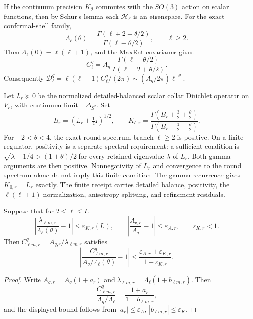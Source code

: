 \begin{theorem}\label{thm:oph-screen-angular-spectrum}
If the continuum precision \(K_\theta\) commutes with the \(SO(3)\) action on scalar functions,
then by Schur's lemma each \(\mathcal H_\ell\) is an eigenspace.  For the exact conformal-shell
family,
\[
  \Lambda_\ell(\theta)
  =\frac{\Gamma(\ell+2+\theta/2)}{\Gamma(\ell-\theta/2)},\qquad \ell\ge2.
\]
Then \(\Lambda_\ell(0)=\ell(\ell+1)\), and the MaxEnt covariance gives
\[
  C_\ell^q
  =A_q\,\frac{\Gamma(\ell-\theta/2)}{\Gamma(\ell+2+\theta/2)}.
\]
Consequently \(\mathcal D_\ell^q=\ell(\ell+1)C_\ell^q/(2\pi)\sim(A_q/2\pi)\ell^{-\theta}\).
\end{theorem}

\begin{definition}\label{def:oph-screen-conformal-precision}
Let \(L_r\succeq0\) be the normalized detailed-balanced scalar collar Dirichlet operator on
\(V_r\), with continuum limit \(-\Delta_{S^2}\).  Set
\[
  B_r=(L_r+\tfrac14I)^{1/2},\qquad
  K_{\theta,r}=
  \frac{\Gamma(B_r+\frac32+\frac\theta2)}
       {\Gamma(B_r-\frac12-\frac\theta2)}.
\]
For \(-2<\theta<4\), the exact round-spectrum branch \(\ell\ge2\) is
positive. On a finite regulator, positivity is a separate spectral
requirement: a sufficient condition is
\(\sqrt{\lambda+1/4}>(1+\theta)/2\) for every retained eigenvalue
\(\lambda\) of \(L_r\). Both gamma arguments are then positive.
Nonnegativity of \(L_r\) and convergence to the round spectrum alone do not
imply this finite condition. The
gamma recurrence gives \(K_{0,r}=L_r\) exactly.  The finite receipt carries detailed balance,
positivity, the \(\ell(\ell+1)\) normalization, anisotropy splitting, and refinement residuals.
\end{definition}

\begin{theorem}\label{thm:oph-screen-refinement}
Suppose that for \(2\le\ell\le L\)
\[
  \left|\frac{\lambda_{\ell m,r}}{\Lambda_\ell(\theta)}-1\right|\le\varepsilon_{K,r}(L),
  \qquad
  \left|\frac{A_{q,r}}{A_q}-1\right|\le\varepsilon_{A,r},
  \qquad \varepsilon_{K,r}<1 .
\]
Then \(C_{\ell m,r}^q=A_{q,r}/\lambda_{\ell m,r}\) satisfies
\[
  \left|
  \frac{C_{\ell m,r}^q}{A_q/\Lambda_\ell(\theta)}-1
  \right|
  \le
  \frac{\varepsilon_{A,r}+\varepsilon_{K,r}}{1-\varepsilon_{K,r}} .
\]
\end{theorem}

\begin{proof}
Write \(A_{q,r}=A_q(1+a_r)\) and
\(\lambda_{\ell m,r}=\Lambda_\ell(1+b_{\ell m,r})\).  Then
\[
  \frac{C_{\ell m,r}^q}{A_q/\Lambda_\ell}=\frac{1+a_r}{1+b_{\ell m,r}},
\]
and the displayed bound follows from \(|a_r|\le\varepsilon_A\),
\(|b_{\ell m,r}|\le\varepsilon_K\).
\end{proof}

